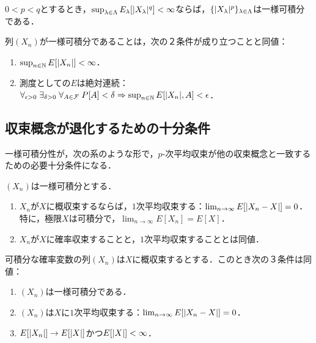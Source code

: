 \documentclass[uplatex,dvipdfmx]{jsreport}
\begin{document}
\begin{corollary}
    $0<p<q$とするとき，$\sup_{\lambda\in\Lambda}E_\lambda[\lvert X_\lambda\rvert^q]<\infty$ならば，$\{\lvert X_\lambda\rvert^p\}_{\lambda\in\Lambda}$は一様可積分である．
\end{corollary}

\begin{lemma}[一様可積分性の特徴付け]
    列$(X_n)$が一様可積分であることは，次の２条件が成り立つことと同値：
    \begin{enumerate}
        \item $\sup_{n\in\mathbb{N}}E[\lvert X_n\rvert]<\infty$．
        \item 測度としての$E$は絶対連続：$\forall_{\epsilon>0}\;\exists_{\delta>0}\;\forall_{A\in\mathcal{F}}\;P[A]<\delta\Rightarrow\sup_{n\in\mathbb{N}}E[\lvert X_n\rvert,A]<\epsilon$．
    \end{enumerate}
\end{lemma}

\subsection{収束概念が退化するための十分条件}

\begin{tcolorbox}[colframe=ForestGreen, colback=ForestGreen!10!white,breakable,colbacktitle=ForestGreen!40!white,coltitle=black,fonttitle=\bfseries\sffamily,
title=]
    一様可積分性が，次の系のような形で，$p$-次平均収束が他の収束概念と一致するための必要十分条件になる．
\end{tcolorbox}

\begin{theorem}[一般化されたLebesgueの優収束定理]
    $(X_n)$は一様可積分とする．
    \begin{enumerate}
        \item $X_n$が$X$に概収束するならば，$1$次平均収束する：$\lim_{n\to\infty}E[\lvert X_n-X\rvert]=0$．
        特に，極限$X$は可積分で，$\lim_{n\to\infty}E[X_n]=E[X]$．
        \item $X_n$が$X$に確率収束することと，$1$次平均収束することとは同値．
    \end{enumerate}
\end{theorem}

\begin{corollary}[一様可積分性の特徴付け]
    可積分な確率変数の列$(X_n)$は$X$に概収束するとする．このとき次の３条件は同値：
    \begin{enumerate}
        \item $(X_n)$は一様可積分である．
        \item $(X_n)$は$X$に$1$次平均収束する：$\lim_{n\to\infty}E[\lvert X_n-X\rvert]=0$．
        \item $E[\lvert X_n\rvert]\to E[\lvert X\rvert]$かつ$E[\lvert X\rvert]<\infty$．
    \end{enumerate}
\end{corollary}
\end{document}
